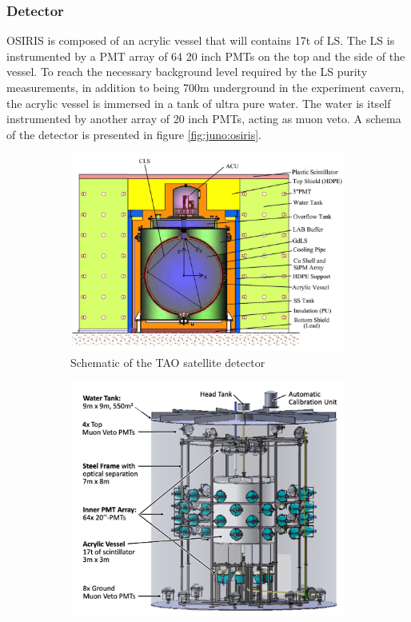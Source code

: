 \documentclass[../main.tex]{subfiles}
\begin{document}
\subsubsection{Detector}
OSIRIS is composed of an acrylic vessel that will contains 17t of LS. The LS is instrumented by a PMT array of 64 20 inch PMTs on the top and the side of the vessel. To reach the necessary background level required by the LS purity measurements, in addition to being 700m underground in the experiment cavern, the acrylic vessel is immersed in a tank of ultra pure water. The water is itself instrumented by another array of 20 inch PMTs, acting as muon veto. A schema of the detector is presented in figure \ref{fig:juno:osiris}.

\begin{figure}[ht]
  \centering
  \begin{subfigure}[t]{0.49\linewidth}
    \includegraphics[width=\linewidth]{images/juno/tao_schematic.png}
    \caption{Schematic of the TAO satellite detector}
    \label{fig:juno:tao}
  \end{subfigure}
  \hfill
  \begin{subfigure}[t]{0.49\linewidth}
    \includegraphics[width=\linewidth]{images/juno/osiris_schematic.png}

\end{subfigure}
\end{figure}
\end{document}
